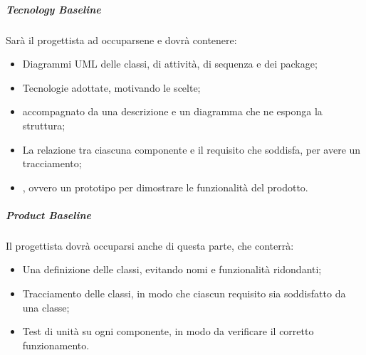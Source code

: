 \subparagraph{Tecnology Baseline}
Sarà il progettista ad occuparsene e dovrà contenere:
\begin{itemize}
\item Diagrammi UML delle classi, di attività, di sequenza e dei package;
\item Tecnologie adottate, motivando le scelte;
\item {} accompagnato da una descrizione e un diagramma che ne esponga la struttura;
\item La relazione tra ciascuna componente e il requisito che soddisfa, per avere un tracciamento;  
\item {}, ovvero un prototipo per dimostrare le funzionalità del prodotto.
\end{itemize}
\subparagraph{Product Baseline}
Il progettista dovrà occuparsi anche di questa parte, che conterrà:
\begin{itemize}
\item Una definizione delle classi, evitando nomi e funzionalità ridondanti;
\item Tracciamento delle classi, in modo che ciascun requisito sia soddisfatto da una classe;
\item Test di unità su ogni componente, in modo da verificare il corretto funzionamento.
\end{itemize}
